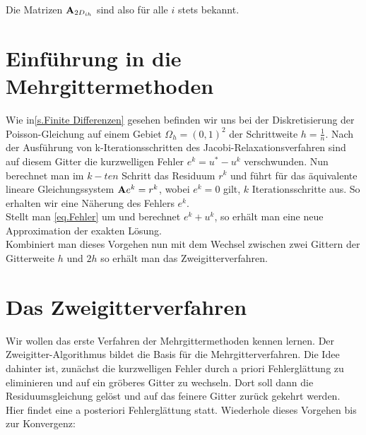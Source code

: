 Die Matrizen ${\textbf{A}}_{2D_{ih}}$ sind also für alle $i$ stets bekannt.

\section{Einführung in die Mehrgittermethoden}

Wie in\autoref{s.Finite Differenzen} gesehen befinden wir uns bei der Diskretisierung der Poisson-Gleichung auf einem Gebiet $\Omega_{h} = (0,1)^{2}$ der Schrittweite $h = \frac {1} {n}$. Nach der Ausführung von k-Iterationsschritten des Jacobi-Relaxationsverfahren sind auf diesem Gitter die kurzwelligen Fehler $e^{k} = u^{*} - u^{k}$ verschwunden. Nun berechnet man im $k-ten$ Schritt das Residuum $r^{k}$ und führt für das äquivalente lineare Gleichungssystem ${\textbf{A}}e^{k} = r^{k}$, wobei $e^{k} = 0$ gilt, $k$ Iterationsschritte aus. So erhalten wir eine Näherung des Fehlers $e^{k}$. \\
Stellt man \autoref{eq.Fehler} um und berechnet $e^{k} + u^{k}$, so erhält man eine neue Approximation der exakten Lösung. \\
Kombiniert man dieses Vorgehen nun mit dem Wechsel zwischen zwei Gittern der Gitterweite $h$ und $2h$ so erhält man das Zweigitterverfahren.

\section{Das Zweigitterverfahren}\label{s.Der Zweigitter-Algorithmus}

Wir wollen das erste Verfahren der Mehrgittermethoden kennen lernen. Der Zweigitter-Algorithmus bildet die Basis für die Mehrgitterverfahren. Die Idee dahinter ist, zunächst die kurzwelligen Fehler durch a priori Fehlerglättung zu eliminieren und auf ein gröberes Gitter zu wechseln. Dort soll dann die Residuumsgleichung gelöst und auf das feinere Gitter zurück gekehrt werden. Hier findet eine a posteriori Fehlerglättung statt. Wiederhole dieses Vorgehen bis zur Konvergenz:

